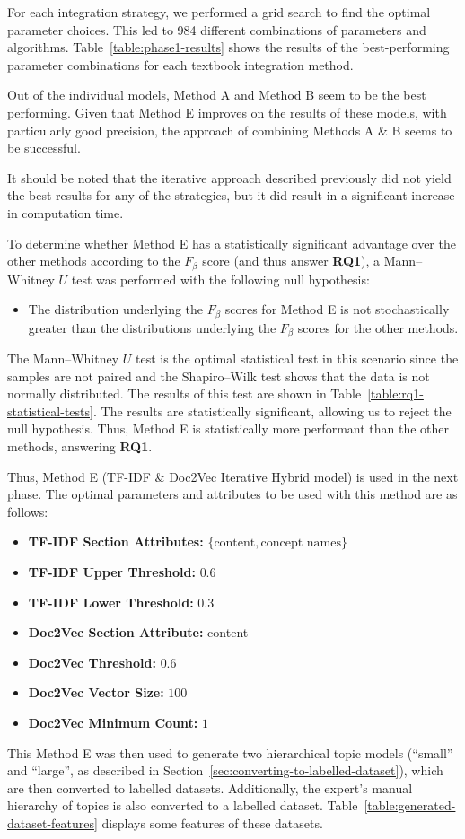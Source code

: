 \documentclass[twocolumn]{article}
\newcommand{\nullhypothesis}[1]{
\vspace{-0.5em}
\begin{itemize}[label=$H_0$:]
\item #1
\end{itemize}
}
\def\bolditem#1{\item\textbf{#1:}}
\begin{document}
For each integration strategy, we performed a grid search to find the optimal parameter choices. This led to 984 different combinations of parameters and algorithms. Table~\ref{table:phase1-results} shows the results of the best-performing parameter combinations for each textbook integration method.

Out of the individual models, Method A and Method B seem to be the best performing. Given that Method E improves on the results of these models, with particularly good precision, the approach of combining Methods A \& B seems to be successful.

It should be noted that the iterative approach described previously did not yield the best results for any of the strategies, but it did result in a significant increase in computation time.

To determine whether Method E has a statistically significant advantage over the other methods according to the $F_\beta$ score (and thus answer \textbf{RQ1}), a Mann–Whitney $U$ test was performed with the following null hypothesis:
\nullhypothesis{
    The distribution underlying the $F_\beta$ scores for Method E is not stochastically greater than the distributions underlying the $F_\beta$ scores for the other methods.
}


The Mann–Whitney $U$ test is the optimal statistical test in this scenario since the samples are not paired and the Shapiro–Wilk test shows that the data is not normally distributed. The results of this test are shown in Table~\ref{table:rq1-statistical-tests}. The results are statistically significant, allowing us to reject the null hypothesis. Thus, Method E is statistically more performant than the other methods, answering \textbf{RQ1}.

Thus, Method E (TF-IDF \& Doc2Vec Iterative Hybrid model) is used in the next phase. The optimal parameters and attributes to be used with this method are as follows:

\begin{itemize} \itemsep-0.2em
    \bolditem{TF-IDF Section Attributes} $\{\text{content}, \text{concept names}\}$
    \bolditem{TF-IDF Upper Threshold} $0.6$
    \bolditem{TF-IDF Lower Threshold} $0.3$
    \bolditem{Doc2Vec Section Attribute} content
    \bolditem{Doc2Vec Threshold} $0.6$
    \bolditem{Doc2Vec Vector Size} $100$
    \bolditem{Doc2Vec Minimum Count} $1$
\end{itemize}

This Method E was then used to generate two hierarchical topic models (``small'' and ``large'', as described in Section~\ref{sec:converting-to-labelled-dataset}), which are then converted to labelled datasets. Additionally, the expert's manual hierarchy of topics is also converted to a labelled dataset. Table~\ref{table:generated-dataset-features} displays some features of these datasets.
\end{document}
